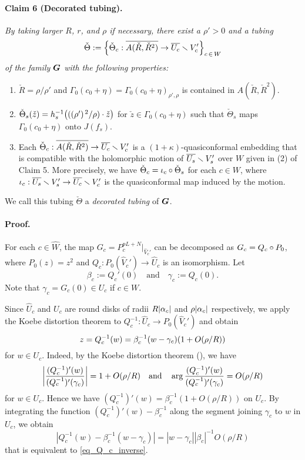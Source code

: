 \medskip


\paragraph{\bf Claim 6 (Decorated tubing).}
{\it 
By taking larger $R$, $r$, and $\rho$ if necessary, 
there exist a $\rho'>0$ and a tubing
$$
\check{\Theta}
:=
{\left\{ 
\check{\Theta}_c: \overline{A(\check{R}, \check{R}^2)} \to \overline{U_c} \smallsetminus {V_c'}
 \right\}}_{c\, \in \,W}
$$
of the family $\boldsymbol{G}$ with the following properties:
\begin{enumerate}[\rm (1)]
\item
$\check{R}=\rho/\rho'$ and 
$\Gamma_0(c_0+\eta)=\Gamma_0(c_0+\eta)_{\rho',\rho}$
is contained in $A(\check{R}, \check{R}^2)$. 
\\[-.9em]
\item
$\check{\Theta}_s(\check{z})
=h_s^{-1}{\left( ((\rho')^{\,2}/\rho) \cdot \check{z} \right)}$ 
for $\check{z} \in \Gamma_0(c_0+\eta)$
such that $\check{\Theta}_s$ maps $\Gamma_0(c_0+\eta)$ onto $J(f_s)$.
\\[-.7em]
\item 
Each $\check{\Theta}_c:\overline{A(\check{R}, \check{R}^2)} \to \overline{U_c} \smallsetminus {V_c'}$
is a $(1+\kappa)$-quasiconformal embedding
that is compatible with the holomorphic motion of 
$\overline{U_s}\smallsetminus V_s'$ over $W$ given in (2) of Claim 5. 
More precisely, 
we have $\check{\Theta}_c=\iota_c \circ \check{\Theta}_s$
for each $c \in W$, 
where $\iota_c: \overline{U_s}\smallsetminus V_s' \to \overline{U_c}\smallsetminus V_c'$ is 
the quasiconformal map 
induced by the motion.
\end{enumerate}
}

We call this tubing $\check{\Theta}$ 
a {\it decorated tubing} of $\boldsymbol{G}$.

\paragraph{\bf Proof.}
For each $c \in \widehat{W}$,
the map ${G}_c=P_c^{pL+N}|_{\widehat{V}_c'}$ 
can be decomposed as
${G}_c=Q_c \circ P_0$, where $P_0(z)=z^2$ and
$Q_c:P_0(\widehat{V}_c') \to \widehat{U}_c$ is an isomorphism. 
Let 
$$
\beta_c:=Q_c'(0)
\quad \text{and} \quad 
\gamma_c:=Q_c(0).
$$
Note that $\gamma_c={G}_c(0) \in U_c$ if $c \in W$.

Since $\widehat{U}_c$ and $U_c$ are round disks 
of radii $R|\alpha_c|$ and $\rho|\alpha_c|$ respectively, 
we apply the Koebe distortion theorem to 
$Q_c^{-1}:\widehat{U}_c \to P_0(\widehat{V}_c')$
and obtain 
\begin{equation}\label{eq_Q_c_inverse}
z=Q_c^{-1}(w)=\beta_c^{-1}(w-\gamma_c){\left( 1+O(\rho/R) \right)}
\end{equation}
for $w \in U_c$.
Indeed, by the Koebe distortion theorem (\cite[\S 2.3]{D 1983}),
we have 
$$
{\left| \frac{(Q_c^{-1})'(w)}{(Q_c^{-1})'(\gamma_c)} \right|}=1+O(\rho/R)
\quad
\text{and}
\quad
\arg\frac{(Q_c^{-1})'(w)}{(Q_c^{-1})'(\gamma_c)}=O(\rho/R)
$$
for $w \in U_c$.
Hence we have $(Q_c^{-1})'(w)=\beta_c^{-1}(1+O(\rho/R))$ on $U_c$.
By integrating the function $(Q_c^{-1})'(w)-\beta_c^{-1}$ 
along the segment joining $\gamma_c$ to $w$ in $U_c$, 
we obtain
$$
|Q_c^{-1}(w)-\beta_c^{-1}(w-\gamma_c)|
=|w-\gamma_c||\beta_c|^{-1}O(\rho/R)
$$
that is equivalent to \eqref{eq_Q_c_inverse}.


